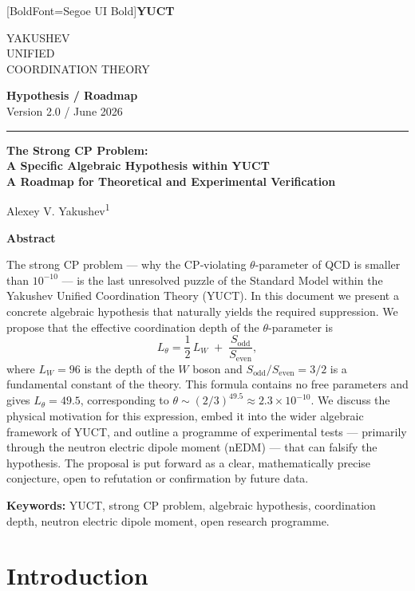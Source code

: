 \documentclass[12pt,a4paper]{article}
\newcommand{\makeheader}{%
	\noindent
	\begin{minipage}{0.17\textwidth}
		\raggedright
		{\fontspec{Segoe UI}[BoldFont=Segoe UI Bold]\bfseries\color{skyblue}\fontsize{46}{46}\selectfont YUCT}%
	\end{minipage}%
	\hspace{30pt}
	\begin{minipage}{0.32\textwidth}
		\raggedright
		{\sffamily\fontsize{11}{13}\selectfont YAKUSHEV\\ UNIFIED\\ COORDINATION THEORY}%
	\end{minipage}%
	\hfill
	\begin{minipage}{0.38\textwidth}
		\raggedleft
		{\sffamily\bfseries Hypothesis / Roadmap}\\ 
		{\sffamily Version 2.0 / June 2026}\\ 
	\end{minipage}
	\par\vspace{5pt}
	\noindent\textcolor{gold}{\rule{\textwidth}{1.6pt}}
	\par\vspace{0pt}
}
\begin{document}
	\thispagestyle{firstpage}
	\makeheader
	
	\vspace{0cm}
	{\LARGE\bfseries The Strong CP Problem:\\[0.1cm] A Specific Algebraic Hypothesis within YUCT\\[0.2cm] \Large A Roadmap for Theoretical and Experimental Verification \par}
	\vspace{0.2cm}
	
	{\large Alexey V. Yakushev\textsuperscript{1}} \\
	\vspace{0.0cm}
	
	{\color{darkblue}\textbf{\LARGE Abstract}} \par
	{\large
		\noindent
		The strong CP problem — why the CP‑violating \(\theta\)-parameter of QCD is smaller than \(10^{-10}\) — is the last unresolved puzzle of the Standard Model within the Yakushev Unified Coordination Theory (YUCT). In this document we present a concrete algebraic hypothesis that naturally yields the required suppression. We propose that the effective coordination depth of the \(\theta\)-parameter is
		\[
		L_\theta = \frac{1}{2}\,L_W \;+\; \frac{S_{\mathrm{odd}}}{S_{\mathrm{even}}},
		\]
		where \(L_W = 96\) is the depth of the \(W\) boson and \(S_{\mathrm{odd}}/S_{\mathrm{even}} = 3/2\) is a fundamental constant of the theory. This formula contains no free parameters and gives \(L_\theta = 49.5\), corresponding to \(\theta \sim (2/3)^{49.5} \approx 2.3 \times 10^{-10}\). We discuss the physical motivation for this expression, embed it into the wider algebraic framework of YUCT, and outline a programme of experimental tests — primarily through the neutron electric dipole moment (nEDM) — that can falsify the hypothesis. The proposal is put forward as a clear, mathematically precise conjecture, open to refutation or confirmation by future data.
	}
	
	\vspace{0.1cm}
	\noindent
	{\color{darkblue}\textbf{Keywords:}} YUCT, strong CP problem, algebraic hypothesis, coordination depth, neutron electric dipole moment, open research programme.
	\vspace{0.4cm}
	
	\clearpage
	\tableofcontents
	\newpage
	
	\section{Introduction}
	\label{sec:intro}
	
\end{document}
